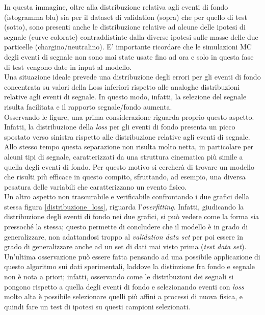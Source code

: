 In questa immagine, oltre alla distribuzione relativa agli eventi di fondo (istogramma blu) sia per il dataset di validation (sopra) che per quello di test (sotto), sono presenti anche le distribuzione relative ad alcune delle ipotesi di segnale (curve colorate) contraddistinte dalla diverse ipotesi sulle masse delle due particelle (chargino/neutralino). E' importante ricordare che le simulazioni MC degli eventi di segnale non sono mai state usate fino ad ora e solo in questa fase di test vengono date in input al modello. \\
Una situazione ideale prevede una distribuzione degli errori per gli eventi di fondo concentrata su valori della Loss inferiori rispetto alle analoghe distribuzioni relative agli eventi di segnale. In questo modo, infatti, la selezione del segnale risulta facilitata e il rapporto segnale/fondo aumenta.\\
Osservando le figure, una prima considerazione riguarda proprio questo aspetto. Infatti, la distribuzione della \textit{loss} per gli eventi di fondo presenta un picco spostato verso sinistra rispetto alle distribuzione relative agli eventi di segnale. Allo stesso tempo questa separazione non risulta molto netta, in particolare per alcuni tipi di segnale, caratterizzati da una struttura cinematica più simile a quella degli eventi di fondo. Per questo motivo si cercherà di trovare un modello che risulti più efficace in questo compito, sfruttando, ad esempio, una diversa pesatura delle variabili che caratterizzano un evento fisico.\\
Un altro aspetto non trascurabile e verificabile confrontando i due grafici della stessa figura \ref{distribuzione_loss}, riguarda l'\textit{overfitting}. Infatti, giudicando la distribuzione degli eventi di fondo nei due grafici, si può vedere come la forma sia pressoché la stessa; questo permette di concludere che il modello è in grado di generalizzare, non adattandosi troppo al \textit{validation data set} per poi essere in grado di generalizzare anche ad un set di dati mai visto prima (\textit{test data set}).\\
Un'ultima osservazione può essere fatta pensando ad una possibile applicazione di questo algoritmo sui dati sperimentali, laddove la distinzione fra fondo e segnale non è nota a priori; infatti, osservando come le distribuzioni dei segnali si pongono rispetto a quella degli eventi di fondo e selezionando eventi con \textit{loss} molto alta è possibile selezionare quelli più affini a processi di nuova fisica, e quindi fare un test di ipotesi su questi campioni selezionati.

